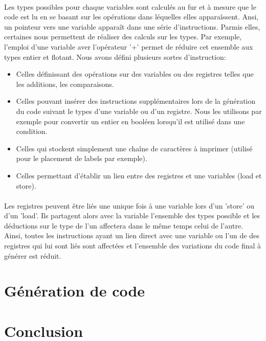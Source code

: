 \documentclass[12pt]{article}
\begin{document}
\paragraph{} Les types possibles pour chaque variables sont calculés au fur et à mesure que
le code est lu en se basant sur les opérations dans léquelles elles
apparaîssent. Ansi, un pointeur vers une variable apparaît dans une série
d'instructions. Parmis elles, certaines nous permettent de réaliser des
calculs sur les types. Par exemple, l'emploi d'une variable aver l'opérateur
'+' permet de réduire cet ensemble aux types entier et flotant. Nous avons défini plusieurs sortes d'instruction:
\begin{itemize}
	\item Celles définissant des opérations sur des variables ou des registres
		telles que les additions, les comparaisons.
	\item Celles pouvant insérer des instructions supplémentaires lors de la
		génération du code suivant le types d'une variable ou d'un registre.
		Nous les utilisons par exemple pour convertir un entier en booléen
		lorsqu'il est utilisé dans une condition.
	\item Celles qui stockent simplement une chaîne de caractères à imprimer
		(utilisé pour le placement de labels par exemple).
	\item Celles permettant d'établir un lien entre des registres et une
		variables (load et store).
\end{itemize}

\paragraph{} Les registres peuvent être liés une unique fois à une variable lors d'un
'store' ou d'un 'load'. Ils partagent alors avec la variable l'ensemble des
types possible et les déductions sur le type de l'un affectera dans le même
temps celui de l'autre. Ainsi, toutes les instructions ayant un lien direct
avec une variable ou l'un de des registres qui lui sont liés sont affectées et
l'ensemble des variations du code final à générer est réduit.





\section{Génération de code}

\section{Conclusion}
\end{document}
